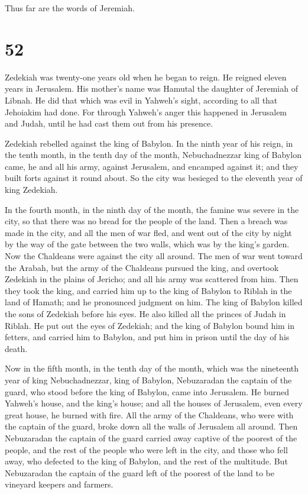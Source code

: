Thus far are the words of Jeremiah.

\hypertarget{section-51}{%
\section{52}\label{section-51}}

 Zedekiah was twenty-one years old when he began to reign.
He reigned eleven years in Jerusalem. His mother's name was Hamutal the
daughter of Jeremiah of Libnah.  He did that which was
evil in Yahweh's sight, according to all that Jehoiakim had done.
 For through Yahweh's anger this happened in Jerusalem and
Judah, until he had cast them out from his presence.

Zedekiah rebelled against the king of Babylon.  In the
ninth year of his reign, in the tenth month, in the tenth day of the
month, Nebuchadnezzar king of Babylon came, he and all his army, against
Jerusalem, and encamped against it; and they built forts against it
round about.  So the city was besieged to the eleventh
year of king Zedekiah.

 In the fourth month, in the ninth day of the month, the
famine was severe in the city, so that there was no bread for the people
of the land.  Then a breach was made in the city, and all
the men of war fled, and went out of the city by night by the way of the
gate between the two walls, which was by the king's garden. Now the
Chaldeans were against the city all around. The men of war went toward
the Arabah,  but the army of the Chaldeans pursued the
king, and overtook Zedekiah in the plains of Jericho; and all his army
was scattered from him.  Then they took the king, and
carried him up to the king of Babylon to Riblah in the land of Hamath;
and he pronounced judgment on him.  The king of Babylon
killed the sons of Zedekiah before his eyes. He also killed all the
princes of Judah in Riblah.  He put out the eyes of
Zedekiah; and the king of Babylon bound him in fetters, and carried him
to Babylon, and put him in prison until the day of his death.

 Now in the fifth month, in the tenth day of the month,
which was the nineteenth year of king Nebuchadnezzar, king of Babylon,
Nebuzaradan the captain of the guard, who stood before the king of
Babylon, came into Jerusalem.  He burned Yahweh's house,
and the king's house; and all the houses of Jerusalem, even every great
house, he burned with fire.  All the army of the
Chaldeans, who were with the captain of the guard, broke down all the
walls of Jerusalem all around.  Then Nebuzaradan the
captain of the guard carried away captive of the poorest of the people,
and the rest of the people who were left in the city, and those who fell
away, who defected to the king of Babylon, and the rest of the
multitude.  But Nebuzaradan the captain of the guard left
of the poorest of the land to be vineyard keepers and farmers.


